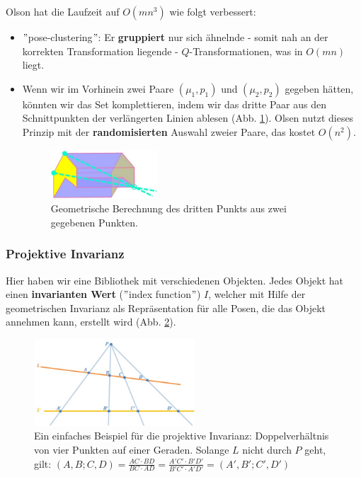 \begin{itemize}
Olson hat die Laufzeit auf $O(mn^3)$ wie folgt verbessert:
\begin{itemize}
\item $"$pose-clustering$"$: Er \textbf{gruppiert} nur sich ähnelnde - somit nah an der korrekten Transformation liegende - $Q$-Transformationen, was in $O(mn)$ liegt.
\item Wenn wir im Vorhinein zwei Paare $(\mu_1,p_1)$ und $(\mu_2,p_2)$ gegeben hätten, könnten wir das Set komplettieren, indem wir das dritte Paar aus den Schnittpunkten der verlängerten Linien ablesen (Abb. \ref{fig:16}).
Olsen nutzt dieses Prinzip mit der \textbf{randomisierten} Auswahl zweier Paare, das kostet $O(n^2)$.
\begin{figure}[h]
\centering
\includegraphics[width=4cm]{chapters/computervision/grafik_16_line.jpg}
\caption{Geometrische Berechnung des dritten Punkts aus zwei gegebenen Punkten.}
\label{fig:16}
\end{figure}
\end{itemize}

\subsubsection{Projektive Invarianz}

Hier haben wir eine Bibliothek mit verschiedenen Objekten.
Jedes Objekt hat einen \textbf{invarianten Wert} ($"$index function$"$) $I$, welcher mit Hilfe der geometrischen Invarianz als Repräsentation für alle Posen, die das Objekt annehmen kann, erstellt wird (Abb. \ref{fig:17}).
\begin{figure}[h]
\centering
\includegraphics[width=6cm]{chapters/computervision/grafik_17_invar.jpg}
\caption{Ein einfaches Beispiel für die projektive Invarianz: Doppelverhältnis von vier Punkten auf einer Geraden. Solange $L$ nicht durch $P$ geht, gilt: $(A,B;C,D)=\frac{AC\cdot BD}{BC\cdot AD}=\frac{A'C'\cdot B'D'}{B'C'\cdot A'D'}=(A',B';C',D')$}
\label{fig:17}
\end{figure}


\end{itemize}
